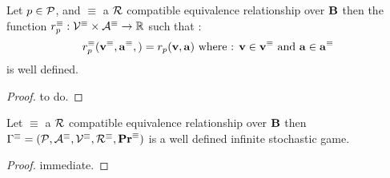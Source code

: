 \begin{myprop}
	Let $p \in \mathcal{P}$, and $\equiv$ a $\mathcal{R}$ compatible equivalence relationship over $\text{\bf B}$ then the function $r_p^\equiv : \mathcal{V}^\equiv \times \mathcal{A}^\equiv \rightarrow \mathbb{R}$ such that :
	$$r_p^\equiv(\mathbf{v}^\equiv,\mathbf{a}^\equiv,) = r_p(\mathbf{v},\mathbf{a}) \mbox{ where : } \mathbf{v}\in \mathbf{v}^\equiv \mbox{ and } \mathbf{a} \in \mathbf{a}^\equiv $$
	is well defined.
\end{myprop}
\begin{proof}
	to do.
\end{proof}

\begin{myprop}
	Let $\equiv$ a $\mathcal{R}$ compatible equivalence relationship over $\text{\bf B}$ then $\Gamma^\equiv = (\mathcal{P},\mathcal{A}^\equiv,\mathcal{V}^\equiv,\mathcal{R}^\equiv,\mathbf{Pr}^\equiv)$ is a well defined infinite stochastic game.
\end{myprop}

\begin{proof}
	immediate.
\end{proof}

